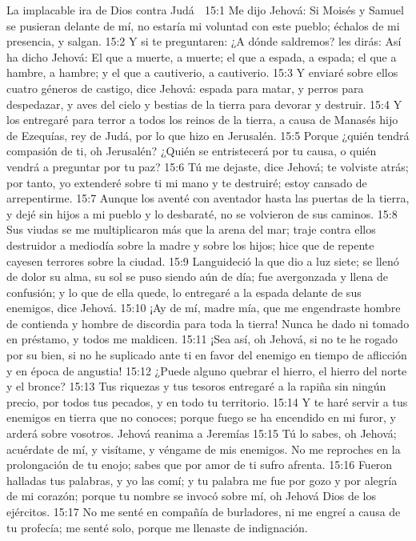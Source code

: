 La implacable ira de Dios contra Judá  

15:1 Me dijo Jehová: Si Moisés y Samuel se pusieran delante de mí, no estaría mi voluntad con este pueblo; échalos de mi presencia, y salgan.  
15:2 Y si te preguntaren: ¿A dónde saldremos? les dirás: Así ha dicho Jehová: El que a muerte, a muerte; el que a espada, a espada; el que a hambre, a hambre; y el que a cautiverio, a cautiverio. 
15:3 Y enviaré sobre ellos cuatro géneros de castigo, dice Jehová: espada para matar, y perros para despedazar, y aves del cielo y bestias de la tierra para devorar y destruir. 
15:4 Y los entregaré para terror a todos los reinos de la tierra, a causa de Manasés hijo de Ezequías, rey de Judá, por lo que hizo en Jerusalén. 
15:5 Porque ¿quién tendrá compasión de ti, oh Jerusalén? ¿Quién se entristecerá por tu causa, o quién vendrá a preguntar por tu paz?  
15:6 Tú me dejaste, dice Jehová; te volviste atrás; por tanto, yo extenderé sobre ti mi mano y te destruiré; estoy cansado de arrepentirme.  
15:7 Aunque los aventé con aventador hasta las puertas de la tierra, y dejé sin hijos a mi pueblo y lo desbaraté, no se volvieron de sus caminos.  
15:8 Sus viudas se me multiplicaron más que la arena del mar; traje contra ellos destruidor a mediodía sobre la madre y sobre los hijos; hice que de repente cayesen terrores sobre la ciudad.  
15:9 Languideció la que dio a luz siete; se llenó de dolor su alma, su sol se puso siendo aún de día; fue avergonzada y llena de confusión; y lo que de ella quede, lo entregaré a la espada delante de sus enemigos, dice Jehová.  
15:10 ¡Ay de mí, madre mía, que me engendraste hombre de contienda y hombre de discordia para toda la tierra! Nunca he dado ni tomado en préstamo, y todos me maldicen.  
15:11 ¡Sea así, oh Jehová, si no te he rogado por su bien, si no he suplicado ante ti en favor del enemigo en tiempo de aflicción y en época de angustia!  
15:12 ¿Puede alguno quebrar el hierro, el hierro del norte y el bronce?  
15:13 Tus riquezas y tus tesoros entregaré a la rapiña sin ningún precio, por todos tus pecados, y en todo tu territorio.  
15:14 Y te haré servir a tus enemigos en tierra que no conoces; porque fuego se ha encendido en mi furor, y arderá sobre vosotros.  
Jehová reanima a Jeremías  
15:15 Tú lo sabes, oh Jehová; acuérdate de mí, y visítame, y véngame de mis enemigos. No me reproches en la prolongación de tu enojo; sabes que por amor de ti sufro afrenta.  
15:16 Fueron halladas tus palabras, y yo las comí; y tu palabra me fue por gozo y por alegría de mi corazón; porque tu nombre se invocó sobre mí, oh Jehová Dios de los ejércitos.  
15:17 No me senté en compañía de burladores, ni me engreí a causa de tu profecía; me senté solo, porque me llenaste de indignación.  
